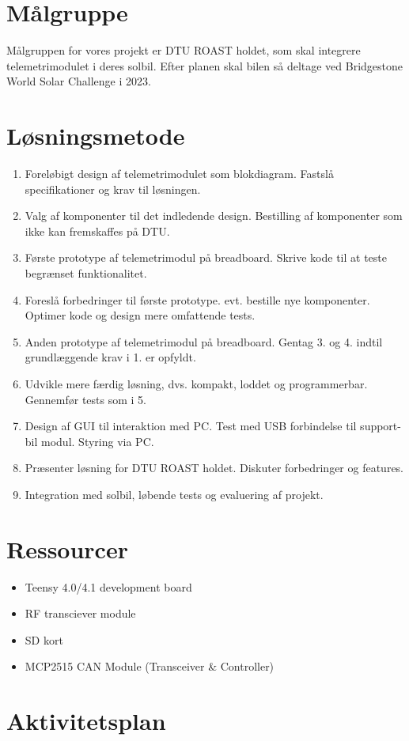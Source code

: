 \documentclass[]{article}
\begin{document}
\section{Målgruppe}
Målgruppen for vores projekt er DTU ROAST holdet, som skal integrere telemetrimodulet i deres solbil. Efter planen skal bilen så deltage ved Bridgestone World Solar Challenge i 2023.
\section{Løsningsmetode}
\begin{enumerate}
    \item Foreløbigt design af telemetrimodulet som blokdiagram. Fastslå specifikationer og krav til løsningen. 
    \item Valg af komponenter til det indledende design. Bestilling af komponenter som ikke kan fremskaffes på DTU. 
    \item Første prototype af telemetrimodul på breadboard. Skrive kode til at teste begrænset funktionalitet. 
    \item Foreslå forbedringer til første prototype. evt. bestille nye komponenter. Optimer kode og design mere omfattende tests.
    \item Anden prototype af telemetrimodul på breadboard. Gentag 3. og 4. indtil grundlæggende krav i 1. er opfyldt. 
    \item Udvikle mere færdig løsning, dvs. kompakt, loddet og programmerbar. Gennemfør tests som i 5. 
    \item Design af GUI til interaktion med PC. Test med USB forbindelse til support-bil modul. Styring via PC.  
    \item Præsenter løsning for DTU ROAST holdet. Diskuter forbedringer og features. 
    \item Integration med solbil, løbende tests og evaluering af projekt. 
\end{enumerate}
\section{Ressourcer}
\begin{itemize}
    \item Teensy 4.0/4.1 development board
    \item RF transciever module
    \item SD kort
    \item MCP2515 CAN Module (Transceiver & Controller)
\end{itemize}
\section{Aktivitetsplan}
\end{document}
